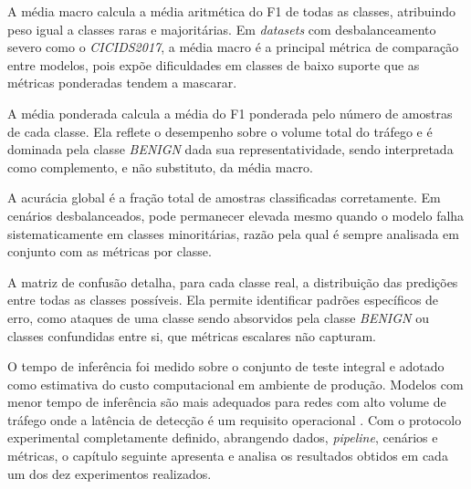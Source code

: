 A média macro calcula a média aritmética do F1 de todas as classes, atribuindo peso igual a classes raras e majoritárias. Em \textit{datasets} com desbalanceamento severo como o \textit{CICIDS2017}, a média macro é a principal métrica de comparação entre modelos, pois expõe dificuldades em classes de baixo suporte que as métricas ponderadas tendem a mascarar.

A média ponderada calcula a média do F1 ponderada pelo número de amostras de cada classe. Ela reflete o desempenho sobre o volume total do tráfego e é dominada pela classe \textit{BENIGN} dada sua representatividade, sendo interpretada como complemento, e não substituto, da média macro.

A acurácia global é a fração total de amostras classificadas corretamente. Em cenários desbalanceados, pode permanecer elevada mesmo quando o modelo falha sistematicamente em classes minoritárias, razão pela qual é sempre analisada em conjunto com as métricas por classe.

A matriz de confusão detalha, para cada classe real, a distribuição das predições entre todas as classes possíveis. Ela permite identificar padrões específicos de erro, como ataques de uma classe sendo absorvidos pela classe \textit{BENIGN} ou classes confundidas entre si, que métricas escalares não capturam.

O tempo de inferência foi medido sobre o conjunto de teste integral e adotado como estimativa do custo computacional em ambiente de produção. Modelos com menor tempo de inferência são mais adequados para redes com alto volume de tráfego onde a latência de detecção é um requisito operacional \cite{sbrc_minicursos}. Com o protocolo experimental completamente definido, abrangendo dados, \textit{pipeline}, cenários e métricas, o capítulo seguinte apresenta e analisa os resultados obtidos em cada um dos dez experimentos realizados.
